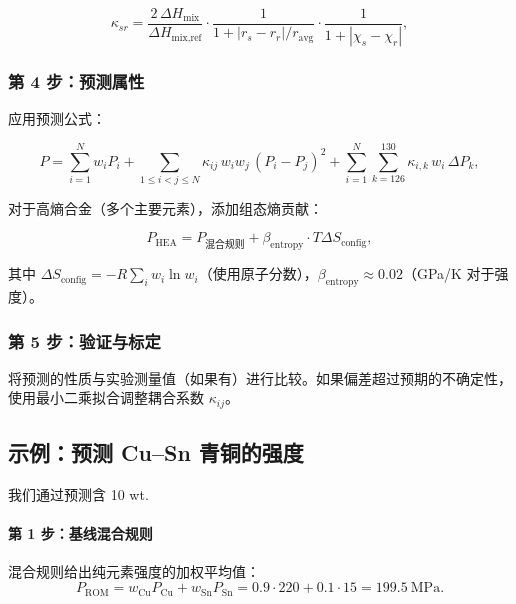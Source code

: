 \documentclass[12pt,a4paper]{article}
\begin{document}
	\[
	\kappa_{sr} = \frac{2\,\Delta H_{\text{mix}}}{\Delta H_{\text{mix,ref}}} \cdot
	\frac{1}{1 + |r_s - r_r|/r_{\text{avg}}} \cdot
	\frac{1}{1 + |\chi_s - \chi_r|},
	\]
	
	\subsubsection{第 4 步：预测属性}
	
	应用预测公式：
	
	\[
	P = \sum_{i=1}^{N} w_i P_i
	+ \sum_{1\le i<j\le N} \kappa_{ij}\, w_i w_j\, (P_i - P_j)^2
	+ \sum_{i=1}^{N} \sum_{k=126}^{130} \kappa_{i,k}\, w_i\, \Delta P_k,
	\]
	
	对于高熵合金（多个主要元素），添加组态熵贡献：
	
	\[
	P_{\text{HEA}} = P_{\text{混合规则}} + \beta_{\text{entropy}} \cdot T \Delta S_{\text{config}},
	\]
	
	其中 \(\Delta S_{\text{config}} = -R \sum_i w_i \ln w_i\)（使用原子分数），\(\beta_{\text{entropy}} \approx 0.02\)（GPa/K 对于强度）。
	
	\subsubsection{第 5 步：验证与标定}
	
	将预测的性质与实验测量值（如果有）进行比较。如果偏差超过预期的不确定性，使用最小二乘拟合调整耦合系数 \(\kappa_{ij}\)。
	
	
	
	\subsection{示例：预测 Cu–Sn 青铜的强度}
	\label{subsec:example-bronze}
	
	我们通过预测含 10 wt.%
	
	\paragraph{第 1 步：基线混合规则}
	混合规则给出纯元素强度的加权平均值：
	\[
	P_{\text{ROM}} = w_{\text{Cu}} P_{\text{Cu}} + w_{\text{Sn}} P_{\text{Sn}} = 0.9 \cdot 220 + 0.1 \cdot 15 = 199.5\ \text{MPa}.
	\]
	
\end{document}
